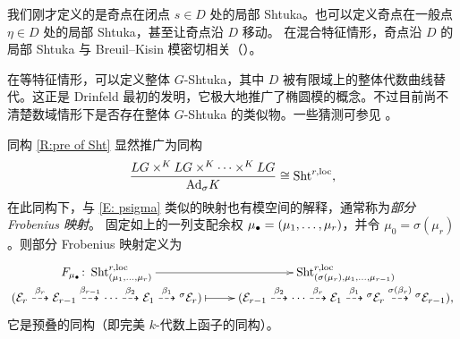 \begin{rmk}
我们刚才定义的是奇点在闭点 $s\in D$ 处的局部 Shtuka。也可以定义奇点在一般点 $\eta\in D$ 处的局部 Shtuka，甚至让奇点沿 $D$ 移动。
在混合特征情形，奇点沿 $D$ 的局部 Shtuka 与 Breuil–Kisin 模密切相关（\cite{SW}）。
\end{rmk}

\begin{rmk}
在等特征情形，可以定义整体 $G$-Shtuka，其中 $D$ 被有限域上的整体代数曲线替代。这正是 Drinfeld 最初的发明，它极大地推广了椭圆模的概念。不过目前尚不清楚数域情形下是否存在整体 $G$-Shtuka 的类似物。一些猜测可参见 \cite{S}。
\end{rmk}

同构 \eqref{R:pre of Sht} 显然推广为同构
$$\frac{LG\times^KLG\times^K\cdots\times^KLG}{{\operatorname{Ad}}_\sigma K}\cong \operatorname{Sht}^{r,\mathrm{loc}},$$
在此同构下，与 \eqref{E: psigma} 类似的映射也有模空间的解释，通常称为\emph{部分 Frobenius 映射}。
固定如上的一列支配余权 ${\mu_\bullet}=(\mu_1,\ldots,\mu_r)$，并令 $\mu_0=\sigma(\mu_r)$。则部分 Frobenius 映射定义为
\begin{equation*}
\label{hpf}
\xymatrix@R=0pt{
F_\mmu\colon \on{Sht}_{(\mu_1,\ldots,\mu_r)}^{r,\loc} \ar[r] & \on{Sht}^{r,\loc}_{(\sigma(\mu_{r}),\mu_1,\ldots,\mu_{r-1})} \\
(\mE_r\stackrel{\beta_r}{\dashrightarrow} \mE_{r-1}\stackrel{\beta_{r-1}}{\dashrightarrow}\cdots\stackrel{\beta_2}{\dashrightarrow} \mE_1\stackrel{\beta_1}{\dashrightarrow} {^\sigma}\mE_r) \ar@{|->}[r] & (\mE_{r-1}\stackrel{\beta_2}{\dashrightarrow}\cdots\stackrel{\beta_r}{\dashrightarrow} \mE_1\stackrel{\beta_1}{\dashrightarrow} {^\sigma}\mE_r\stackrel{\sigma(\beta_r)}{\dashrightarrow} {^\sigma}\mE_{r-1}),
}
\end{equation*}
它是预叠的同构（即完美 $k$-代数上函子的同构）。

